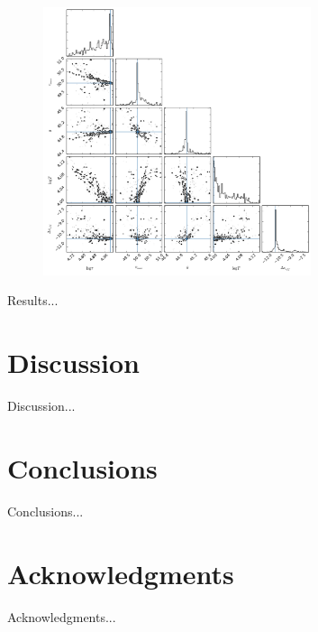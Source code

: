 \documentclass{emulateapj}
\begin{document}
\begin{figure}
\begin{center}
  \includegraphics[width=0.7\textwidth]{parameters.png}
\end{center}
\caption{
    \label{fig:mcmc_triangle}}  
\end{figure}

Results...\\


\section{Discussion}
\label{sec:discussion}

Discussion...\\


\section{Conclusions}
\label{sec:conclusions}

Conclusions...\\


\section*{Acknowledgments}

Acknowledgments...\\





\end{document}
